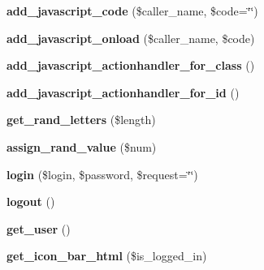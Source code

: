 \begin{DoxyCompactItemize}
\item 
\hypertarget{classlms__portal_aac0210b30a96a345f1095449da2e894b}{
{\bfseries add\_\-javascript\_\-code} (\$caller\_\-name, \$code=\char`\"{}\char`\"{})}
\label{classlms__portal_aac0210b30a96a345f1095449da2e894b}

\item 
\hypertarget{classlms__portal_a2bb3cfdbaa6381b27f35909635cf1535}{
{\bfseries add\_\-javascript\_\-onload} (\$caller\_\-name, \$code)}
\label{classlms__portal_a2bb3cfdbaa6381b27f35909635cf1535}

\item 
\hypertarget{classlms__portal_aafc8e1e39b37d66bdeb8f7fdcf0567c3}{
{\bfseries add\_\-javascript\_\-actionhandler\_\-for\_\-class} ()}
\label{classlms__portal_aafc8e1e39b37d66bdeb8f7fdcf0567c3}

\item 
\hypertarget{classlms__portal_a10038b72de4193a24ce21b123e4566cf}{
{\bfseries add\_\-javascript\_\-actionhandler\_\-for\_\-id} ()}
\label{classlms__portal_a10038b72de4193a24ce21b123e4566cf}

\item 
\hypertarget{classlms__portal_acaced26726575bc0b85aa6204d617b14}{
{\bfseries get\_\-rand\_\-letters} (\$length)}
\label{classlms__portal_acaced26726575bc0b85aa6204d617b14}

\item 
\hypertarget{classlms__portal_a594e6506db2d96d285071fdd9445e59e}{
{\bfseries assign\_\-rand\_\-value} (\$num)}
\label{classlms__portal_a594e6506db2d96d285071fdd9445e59e}

\item 
\hypertarget{classlms__portal_af8fefa239f344f86e48bf54fc35b7efd}{
{\bfseries login} (\$login, \$password, \$request=\char`\"{}\char`\"{})}
\label{classlms__portal_af8fefa239f344f86e48bf54fc35b7efd}

\item 
\hypertarget{classlms__portal_a765a48d5824e1a06500d68fd0610e385}{
{\bfseries logout} ()}
\label{classlms__portal_a765a48d5824e1a06500d68fd0610e385}

\item 
\hypertarget{classlms__portal_aadb267293b6ecad24b830d4ec4a0d324}{
{\bfseries get\_\-user} ()}
\label{classlms__portal_aadb267293b6ecad24b830d4ec4a0d324}

\item 
\hypertarget{classlms__portal_a6803d55ee36843bc9709b849c803cca6}{
{\bfseries get\_\-icon\_\-bar\_\-html} (\$is\_\-logged\_\-in)}
\label{classlms__portal_a6803d55ee36843bc9709b849c803cca6}


\end{DoxyCompactItemize}
